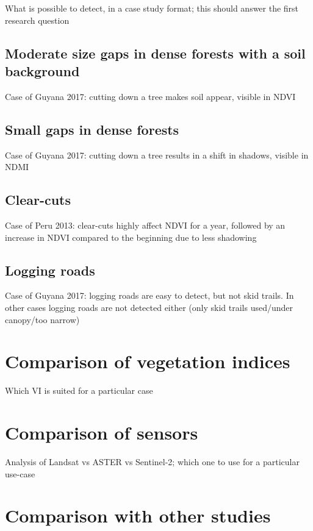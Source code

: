 \documentclass[a4paper,12pt]{scrbook}
\begin{document}
What is possible to detect, in a case study format; this should answer the first research question

\subsection{Moderate size gaps in dense forests with a soil background}

Case of Guyana 2017: cutting down a tree makes soil appear, visible in \ac{NDVI}

\subsection{Small gaps in dense forests}

Case of Guyana 2017: cutting down a tree results in a shift in shadows, visible in \ac{NDMI}

\subsection{Clear-cuts}

Case of Peru 2013: clear-cuts highly affect \ac{NDVI} for a year, followed by an increase in \ac{NDVI} compared to the beginning due to less shadowing

\subsection{Logging roads}

Case of Guyana 2017: logging roads are easy to detect, but not skid trails. In other cases logging roads are not detected either (only skid trails used/under canopy/too narrow)

\section{Comparison of vegetation indices}

Which VI is suited for a particular case

\section{Comparison of sensors}

Analysis of Landsat vs ASTER vs Sentinel-2; which one to use for a particular use-case

\section{Comparison with other studies}
\end{document}
